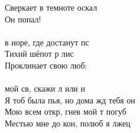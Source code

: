 \documentclass[fleqn,a5paper,12pt,twoside]{guitartabs}
\begin{document}
    \-\hspace{10mm}Сверкает в темноте оскал\\
    \-\hspace{10mm}Он попал!\\
    \\
     в норе, где  достанут пс\\
    Тихий шёпот р лис\\
    Проклинает  свою люб:\\
    \\
     мой св, скажи л или н\\
    Я тоб была пья, но дома жд тебя он\\
    Мою  всем откр, гнев мой т погуб\\
    Местью  мне до кон, полюб я лжец\\
\newpage
{}%
\end{document}
